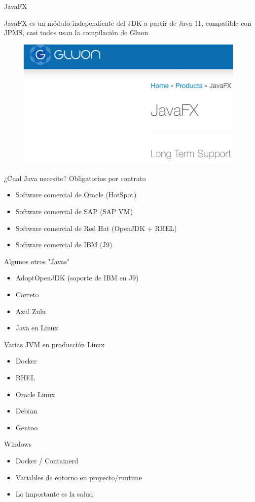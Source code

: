 \documentclass[aspectratio=169]{beamer}
\begin{document}
\begin{frame}[fragile]{JavaFX}

    JavaFX es un módulo independiente del JDK a partir de Java 11, compatible con JPMS, casi todos usan la compilación de Gluon
    \begin{figure}
        \centering
        \includegraphics[width=\linewidth]{Images/gluon}
    \end{figure}
\end{frame}

\begin{frame}[fragile]{¿Cual Java necesito?}
    Obligatorios por contrato
    \begin{itemize}
        \item Software comercial de Oracle (HotSpot)
        \item Software comercial de SAP (SAP VM)
        \item Software comercial de Red Hat (OpenJDK + RHEL)
        \item Software comercial de IBM (J9)
    \end{itemize}
    Algunos otros "Javas"
\begin{itemize}
    \item AdoptOpenJDK (soporte de IBM en J9)
    \item Correto
    \item Azul Zulu
    \item Java en Linux
\end{itemize}
\end{frame}

\begin{frame}[fragile]{Varias JVM en producción}
    Linux
    \begin{itemize}
        \item Docker
        \item RHEL
        \item Oracle Linux
        \item Debian
        \item Gentoo
    \end{itemize}
    Windows
    \begin{itemize}
        \item Docker / Containerd
        \item Variables de entorno en proyecto/runtime
        \item Lo importante es la salud
    \end{itemize}
\end{frame}
\end{document}
